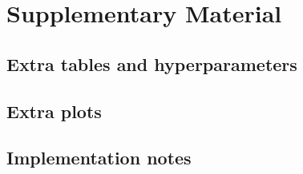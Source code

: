 \chapter{Supplementary Material}\label{ch:appendix}

\section{Extra tables and hyperparameters}\label{sec:app-tables}

\section{Extra plots}\label{sec:app-plots}

\section{Implementation notes}\label{sec:app-impl}
